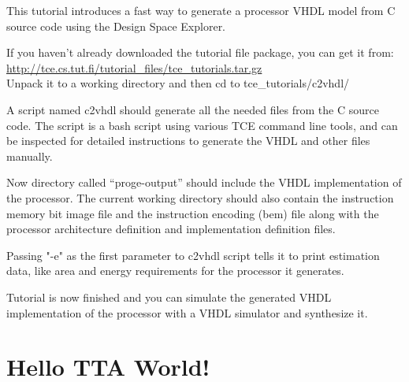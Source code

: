 \documentclass[twoside]{tceusermanual}
\begin{document}
This tutorial introduces a fast way to generate a processor VHDL model
from C source code using the Design Space Explorer.
 
If you haven't already downloaded the tutorial file package, you can get it 
from:\\
\url{http://tce.cs.tut.fi/tutorial_files/tce_tutorials.tar.gz} \\
Unpack it to a working directory and then cd to tce\_tutorials/c2vhdl/

A script named c2vhdl should generate all the needed files from the C source
code. The script is a bash script using various TCE command line tools, and
can be inspected for detailed instructions to generate the VHDL and other
files manually.


Now directory called ``proge-output'' should include the VHDL implementation
of the processor.
The current working directory should also contain the instruction memory bit
image file and the instruction encoding (bem) file along with the processor
architecture definition and implementation definition files.

Passing "-e" as the first parameter to c2vhdl script tells it to print
estimation data, like area and energy requirements for the processor it
generates.

Tutorial is now finished and you can simulate the generated VHDL
implementation of the processor with a VHDL simulator and synthesize it.


%



\section{Hello TTA World!}
\end{document}
